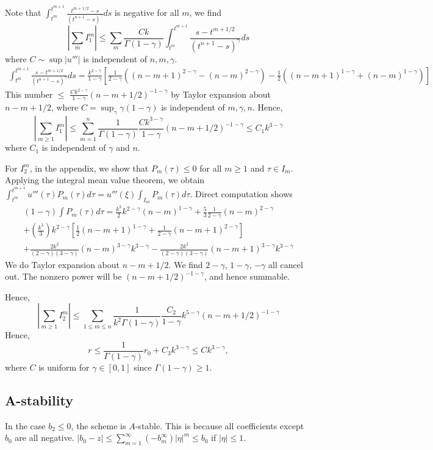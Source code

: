 \documentclass[11pt]{article} %
\begin{document}
Note that $\int_{t^m}^{t^{m+1}}\frac{t^{m+1/2}-s}{(t^{n+1}-s)^{\gamma}}ds$
is negative for all $m$, we find $$
|\sum_m I_1^m|\le \sum_m \frac{Ck}{\Gamma(1-\gamma)}\int_{t^m}^{t^{m+1}}\frac{s-t^{m+1/2}}{(t^{n+1}-s)^{\gamma}}ds
$$
where $C\sim \sup|u'''|$ is independent of $n,m,\gamma$.
\begin{multline*}
\int_{t^m}^{t^{m+1}}\frac{s-t^{m+1/2}}{(t^{n+1}-s)^{\gamma}}ds
=\frac{k^{2-\gamma}}{1-\gamma}[
\frac{1}{2-\gamma}((n-m+1)^{2-\gamma}-(n-m)^{2-\gamma})
-\frac{1}{2}((n-m+1)^{1-\gamma}+(n-m)^{1-\gamma})]
\end{multline*}
This number $\le$ $\frac{Ck^{2-\gamma}}{1-\gamma}(n-m+1/2)^{-1-\gamma}$ by Taylor expansion about $n-m+1/2$, where $C=\sup_{\gamma}\gamma(1-\gamma)$ is independent of $m,\gamma, n$. Hence, $$
|\sum_{m\ge 1} I_1^m|\le \sum_{m=1}^n
\frac{1}{\Gamma(1-\gamma)}\frac{Ck^{3-\gamma}}{1-\gamma}(n-m+1/2)^{-1-\gamma}\le C_1k^{3-\gamma}
$$
where $C_1$ is independent of $\gamma$ and $n$.

For $I_2^m$, in the appendix, we show that $P_m(\tau)\le 0$ for all $m\ge 1$ and $\tau\in I_m$. Applying the integral mean value theorem, we obtain  $\int_{t^m}^{t^{m+1}}u'''(\tau)P_m(\tau)d\tau
=u'''(\xi) \int_{I_m}P_m(\tau)d\tau$. Direct computation shows
\begin{multline*}
(1-\gamma)\int P_m(\tau)d\tau=\frac{k^3}{2}k^{2-\gamma}(n-m)^{1-\gamma}+
\frac{5}{3}\frac{1}{2-\gamma}(n-m)^{2-\gamma}\\
+(\frac{k^3}{3})k^{2-\gamma}[\frac{1}{2}(n-m+1)^{1-\gamma}+\frac{1}{2-\gamma}(n-m+1)^{2-\gamma}]\\
+\frac{2k^2}{(2-\gamma)(3-\gamma)}(n-m)^{3-\gamma}k^{3-\gamma}
-\frac{2k^2}{(2-\gamma)(3-\gamma)}(n-m+1)^{3-\gamma}k^{3-\gamma}
\end{multline*}
We do Taylor expansion about $n-m+1/2$. We find $2-\gamma$, $1-\gamma$, $-\gamma$ all cancel out. 
The nonzero power will be $(n-m+1/2)^{-1-\gamma}$, and hence summable.

Hence,  $$
|\sum_{m\ge 1}I_2^m|\le\sum_{1\le m\le n}\frac{1}{k^2\Gamma(1-\gamma)} \frac{C_2}{1-\gamma}k^{5-\gamma}(n-m+1/2)^{-1-\gamma}
$$
Hence, $$
r\le \frac{1}{\Gamma(1-\gamma)}r_0+C_3k^{3-\gamma}\le Ck^{3-\gamma},
$$
where $C$ is uniform for $\gamma\in [0,1]$ since $\Gamma(1-\gamma)\ge 1$.


\subsection{A-stability}
 In the case $b_2\le 0$, the scheme is $A$-stable. This is because all coefficients except $b_0$ are all negative. $|b_0-z|\le \sum_{m=1}^{\infty}(-b_m^{\infty})|\eta|^m\le b_0$
if $|\eta|\le 1$. 
\end{document}
